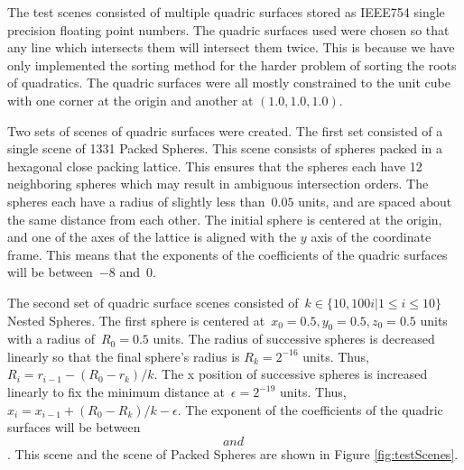 \documentclass{cccg16}
\begin{document}
The test scenes consisted of multiple quadric surfaces stored as
IEEE754 single precision floating point numbers.  The quadric surfaces
used were chosen so that any line which intersects them will intersect
them twice.  This is because we have only implemented the sorting
method for the harder problem of sorting the roots of quadratics.  The
quadric surfaces were all mostly constrained to the unit cube with one
corner at the origin and another at $(1.0, 1.0, 1.0)$.  

Two sets of scenes of quadric surfaces were created.  The first set
consisted of a single scene of 1331 Packed Spheres.  This scene
consists of spheres packed in a hexagonal close packing lattice.  This
ensures that the spheres each have 12 neighboring spheres which may
result in ambiguous intersection orders.  The spheres each have a
radius of slightly less than~$0.05$ units, and are spaced about the
same distance from each other.  The initial sphere is centered at the
origin, and one of the axes of the lattice is aligned with the $y$
axis of the coordinate frame.  This means that the exponents of the
coefficients of the quadric surfaces will be between~$-8$ and~$0$.

The second set of quadric surface scenes consisted of~$k\in\{10, 100i
| 1\leq i \leq 10\}$ Nested Spheres.  The first sphere is centered
at~$x_0=0.5, y_0=0.5, z_0=0.5$ units with a radius of~$R_0=0.5$ units.
The radius of successive spheres is decreased linearly so that the
final sphere's radius is $R_k=2^{-16}$ units.  Thus,
$R_i=r_{i-1}-(R_0-r_k)/k$.  The x position of successive spheres is
increased linearly to fix the minimum distance at~$\epsilon=2^{-19}$
units. Thus, $x_i=x_{i-1}+(R_0-R_k)/k-\epsilon$.  The exponent of the
coefficients of the quadric surfaces will be between~$$ and~$$.  This
scene and the scene of Packed Spheres are shown in Figure
\ref{fig:testScenes}.
\end{document}
